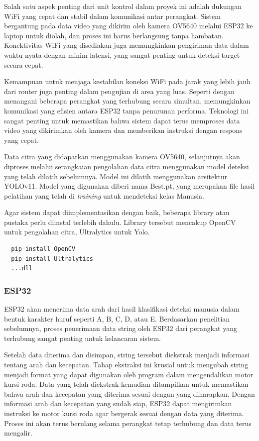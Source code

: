 Salah satu aspek penting dari unit kontrol dalam proyek ini adalah dukungan WiFi yang cepat dan stabil dalam komunikasi antar perangkat. Sistem bergantung pada data video yang dikirim oleh kamera OV5640 melalui ESP32 ke laptop untuk diolah, dan proses ini harus berlangsung tanpa hambatan. Konektivitas WiFi yang disediakan juga memungkinkan pengiriman data dalam waktu nyata dengan minim latensi, yang sangat penting untuk deteksi target secara cepat.

Kemampuan untuk menjaga kestabilan koneksi WiFi pada jarak yang lebih jauh dari router juga penting dalam pengujian di area yang luas. Seperti dengan menangani beberapa perangkat yang terhubung secara simultan, memungkinkan komunikasi yang efisien antara ESP32 tanpa penurunan performa. Teknologi ini sangat penting untuk memastikan bahwa sistem dapat terus memproses data video yang dikirimkan oleh kamera dan memberikan instruksi dengan respons yang cepat.

Data citra yang didapatkan menggunakan kamera OV5640, selanjutnya akan diproses melalui serangkaian pengolahan data citra menggunakan model deteksi yang telah dilatih sebelumnya. Model ini dilatih menggunakan arsitektur YOLOv11. Model yang digunakan diberi nama Best.pt, yang merupakan file hasil pelatihan yang telah di \emph{training} untuk mendeteksi kelas Manusia.

Agar sistem dapat diimplementasikan dengan baik, beberapa library atau pustaka perlu diinstal terlebih dahulu. Library tersebut mencakup OpenCV untuk pengolahan citra, Ultralytics untuk Yolo.

\begin{lstlisting}
  pip install OpenCV
  pip install Ultralytics
  ...dll
\end{lstlisting}

\subsubsection{ESP32}
\label{subsubsec:ESP32}
ESP32 akan menerima data arah dari hasil klasifikasi deteksi manusia dalam bentuk karakter huruf seperti A, B, C, D, atau E. Berdasarkan penelitian sebelumnya, proses penerimaan data string oleh ESP32 dari perangkat yang terhubung sangat penting untuk kelancaran sistem.

Setelah data diterima dan disimpan, string tersebut diekstrak menjadi informasi tentang arah dan kecepatan. Tahap ekstraksi ini krusial untuk mengubah string menjadi format yang dapat digunakan oleh program dalam mengendalikan motor kursi roda. Data yang telah diekstrak kemudian ditampilkan untuk memastikan bahwa arah dan kecepatan yang diterima sesuai dengan yang diharapkan. Dengan informasi arah dan kecepatan yang sudah siap, ESP32 dapat mengirimkan instruksi ke motor kursi roda agar bergerak sesuai dengan data yang diterima. Proses ini akan terus berulang selama perangkat tetap terhubung dan data terus mengalir.


